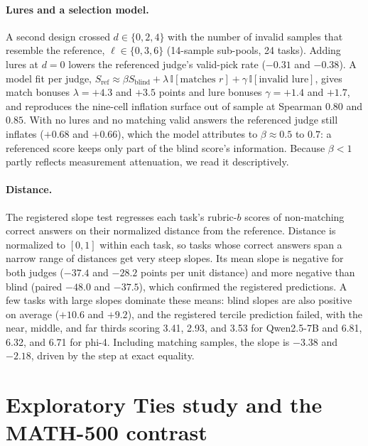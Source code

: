 \paragraph{Lures and a selection model.}
A second design crossed $d \in \{0,2,4\}$ with the number of invalid samples that resemble the reference, $\ell \in \{0,3,6\}$ (14-sample sub-pools, 24 tasks). Adding lures at $d{=}0$ lowers the referenced judge's valid-pick rate ($-0.31$ and $-0.38$). A model fit per judge,
$S_{\text{ref}} \approx \beta S_{\text{blind}} + \lambda\,\mathbb{I}[\text{matches } r] + \gamma\,\mathbb{I}[\text{invalid lure}]$,
gives match bonuses $\lambda = +4.3$ and $+3.5$ points and lure bonuses $\gamma = +1.4$ and $+1.7$, and reproduces the nine-cell inflation surface out of sample at Spearman $0.80$ and $0.85$. With no lures and no matching valid answers the referenced judge still inflates ($+0.68$ and $+0.66$), which the model attributes to $\beta \approx 0.5$ to $0.7$: a referenced score keeps only part of the blind score's information. Because $\beta<1$ partly reflects measurement attenuation, we read it descriptively.

\paragraph{Distance.}
The registered slope test regresses each task's rubric-$b$ scores of non-matching correct answers on their normalized distance from the reference. Distance is normalized to $[0,1]$ within each task, so tasks whose correct answers span a narrow range of distances get very steep slopes. Its mean slope is negative for both judges ($-37.4$  and $-28.2$  points per unit distance) and more negative than blind (paired $-48.0$ and $-37.5$), which confirmed the registered predictions. A few tasks with large slopes dominate these means: blind slopes are also positive on average ($+10.6$ and $+9.2$), and the registered tercile prediction failed, with the near, middle, and far thirds scoring 3.41, 2.93, and 3.53 for Qwen2.5-7B and 6.81, 6.32, and 6.71 for phi-4. Including matching samples, the slope is $-3.38$ and $-2.18$, driven by the step at exact equality.

\FloatBarrier
\section{Exploratory Ties study and the MATH-500 contrast}
\label{app:ties}

